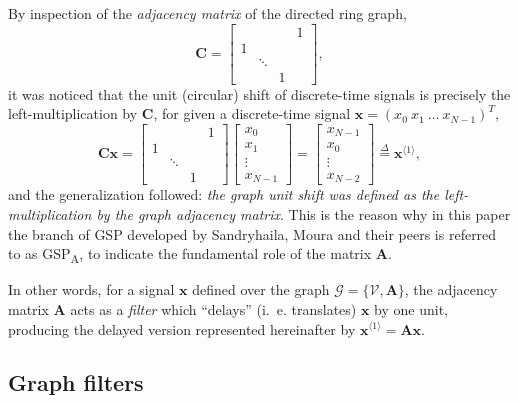 By inspection of the \emph{adjacency matrix} of the directed ring graph,
\begin{equation}\label{eq:C}
\mathbf{C} =
\begin{bmatrix}
&  &  &   1\\ 
1 &  &   & \\ 
&   \ddots &  & \\ 
&  &   1 & 
\end{bmatrix},
\end{equation}
it was noticed that the unit (circular) shift of discrete-time signals is precisely the left-multiplication by $ \mathbf{C} $, for given a discrete-time signal $ \mathbf{x} = (x_0 \ x_1 \ \dots \ x_{N-1})^T $,
\begin{equation}\label{eq:unit_shift}
\mathbf{C}\mathbf{x} =
\begin{bmatrix}
&  &  &   1\\ 
1 &  &   & \\ 
&   \ddots &  & \\ 
&  &   1 & 
\end{bmatrix}
\begin{bmatrix}
x_0 \\ x_1 \\ \vdots \\ x_{N-1}
\end{bmatrix} =
\begin{bmatrix}
x_{N-1} \\ x_0 \\ \vdots \\ x_{N-2}
\end{bmatrix} \overset{\Delta}{=} \mathbf{x}^{\langle 1 \rangle},
\end{equation}
and the generalization followed: \emph{the graph unit shift was defined as the left-multiplication by the graph adjacency matrix}. This is the reason why in this paper the branch of GSP developed by Sandryhaila, Moura and their peers is referred to as GSP\textsubscript{A}, to indicate the fundamental role of the matrix $ \mathbf{A} $.

In other words, for a signal $ \mathbf{x} $ defined over the graph $ \mathcal{G} = \{\mathcal{V}, \mathbf{A}\} $, the adjacency matrix $ \mathbf{A} $ acts as a \emph{filter} which ``delays'' (i.~e. translates) $ \mathbf{x} $ by one unit, producing the delayed version represented hereinafter by $ \mathbf{x}^{\langle 1 \rangle} = \mathbf{A} \mathbf{x}$.

\subsection{Graph filters}
\label{subsec:filtros}


